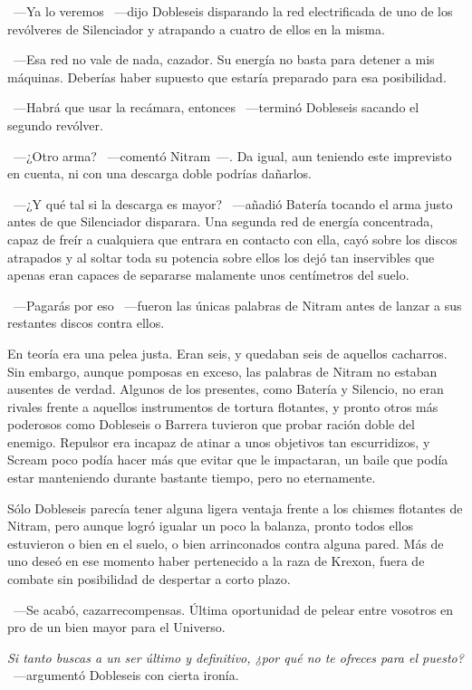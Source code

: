 ~---Ya lo veremos ~---dijo Dobleseis disparando la red electrificada de uno de los revólveres de Silenciador y atrapando a cuatro de ellos en la misma.

~---Esa red no vale de nada, cazador. Su energía no basta para detener a mis máquinas. Deberías haber supuesto que estaría preparado para esa posibilidad.

~---Habrá que usar la recámara, entonces ~---terminó Dobleseis sacando el segundo revólver.

~---¿Otro arma? ~---comentó Nitram~---. Da igual, aun teniendo este imprevisto en cuenta, ni con una descarga doble podrías dañarlos.

~---¿Y qué tal si la descarga es mayor? ~---añadió Batería tocando el arma justo antes de que Silenciador disparara. Una segunda red de energía concentrada, capaz de freír a cualquiera que entrara en contacto con ella, cayó sobre los discos atrapados y al soltar toda su potencia sobre ellos los dejó tan inservibles que apenas eran capaces de separarse malamente unos centímetros del suelo.

~---Pagarás por eso ~---fueron las únicas palabras de Nitram antes de lanzar a sus restantes discos contra ellos.

En teoría era una pelea justa. Eran seis, y quedaban seis de aquellos cacharros. Sin embargo, aunque pomposas en exceso, las palabras de Nitram no estaban ausentes de verdad. Algunos de los presentes, como Batería y Silencio, no eran rivales frente a aquellos instrumentos de tortura flotantes, y pronto otros más poderosos como Dobleseis o Barrera tuvieron que probar ración doble del enemigo. Repulsor era incapaz de atinar a unos objetivos tan escurridizos, y Scream poco podía hacer más que evitar que le impactaran, un baile que podía estar manteniendo durante bastante tiempo, pero no eternamente.

Sólo Dobleseis parecía tener alguna ligera ventaja frente a los chismes flotantes de Nitram, pero aunque logró igualar un poco la balanza, pronto todos ellos estuvieron o bien en el suelo, o bien arrinconados contra alguna pared. Más de uno deseó en ese momento haber pertenecido a la raza de Krexon, fuera de combate sin posibilidad de despertar a corto plazo.

~---Se acabó, cazarrecompensas. Última oportunidad de pelear entre vosotros en pro de un bien mayor para el Universo.

\emph{Si tanto buscas a un ser último y definitivo, ¿por qué no te ofreces para el puesto?} ~---argumentó Dobleseis con cierta ironía.

